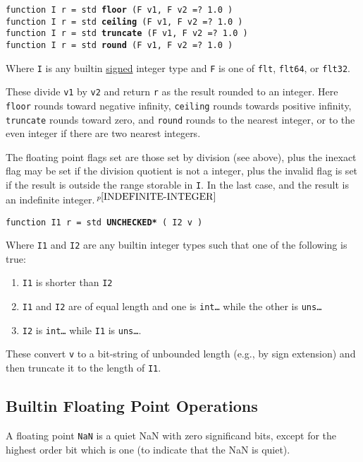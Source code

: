 \documentclass[12pt]{article}
\newcommand{\ttkey}[1]{{\tt \bfseries #1}}
\newcommand{\pagnote}[1]{$\,^{p\pageref{#1}}$}
\newenvironment{indpar}[1][0.3in]%
	{\begin{list}{}%
		     {\setlength{\itemsep}{0in}%
		      \setlength{\topsep}{0in}%
		      \setlength{\parsep}{1ex}%
		      \setlength{\labelwidth}{#1}%
		      \setlength{\leftmargin}{#1}%
		      \addtolength{\leftmargin}{\labelsep}}%
	 \item}%
	{\end{list}}
\begin{document}
{\tt function I r = std \ttkey{floor} (F v1, F v2 =? 1.0 )} \\
{\tt function I r = std \ttkey{ceiling} (F v1, F v2 =? 1.0 )} \\
{\tt function I r = std \ttkey{truncate} (F v1, F v2 =? 1.0 )} \\
{\tt function I r = std \ttkey{round} (F v1, F v2 =? 1.0 )}
\begin{indpar}
Where {\tt I} is any builtin \underline{signed} integer type
and {\tt F} is one of {\tt flt}, {\tt flt64}, or {\tt flt32}.

These divide {\tt v1} by {\tt v2} and return {\tt r} as the
result rounded to an integer.
Here {\tt floor} rounds toward negative infinity, {\tt ceiling}
rounds towards positive infinity, {\tt truncate} rounds toward
zero, and {\tt round} rounds to the nearest integer, or to the
even integer if there are two nearest integers.

The floating point flags set are those set by division (see above), plus the
inexact flag may be set if the division quotient is not a integer, plus
the invalid flag is set if the result is outside the range storable in
{\tt I}.  In the last case, and the result is
an indefinite integer.\pagnote{INDEFINITE-INTEGER}
\end{indpar}

{\tt function I1 r = std \ttkey{*UNCHECKED*} ( I2 v )}
\begin{indpar}
Where {\tt I1} and {\tt I2} are any builtin integer types
such that one of the following is true:
\begin{enumerate}
\item {\tt I1} is shorter than {\tt I2}
\item {\tt I1} and {\tt I2} are of equal length and one
is {\tt int\ldots} while the other is {\tt uns\ldots}
\item {\tt I2} is {\tt int\ldots} while {\tt I1} is {\tt uns\ldots}.
\end{enumerate}

These convert {\tt v} to a bit-string of unbounded length (e.g., by
sign extension) and
then truncate it to the length of {\tt I1}.
\end{indpar}

\subsection{Builtin Floating Point Operations}
\label{BUILTIN-FLOATING-POINT-OPERATIONS}

A floating point {\tt NaN}
is a quiet NaN with zero significand bits, except for the
highest order bit which is one (to indicate that the NaN is quiet).
\end{document}
